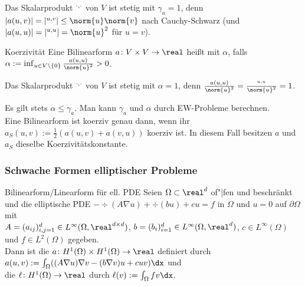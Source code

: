 \begin{Bsp}
    Das Skalarprodukt $\sp{\cdot, \cdot}$ von $V$ ist stetig mit $\gamma_a = 1$, denn
    $|a(u, v)| = |\sp{u, v}| \le \norm{u} \norm{v}$ nach Cauchy-Schwarz
    (und $|a(u, u)| = |\sp{u, u}| = \norm{u}^2$ für $u = v$).
\end{Bsp}

\linie

\begin{Def}{Koerzivität}
    Eine Bilinearform $a\colon V \times V \to \real$ heißt  mit
     $\alpha$, falls
    $\alpha := \inf_{u \in V \setminus \{0\}} \frac{a(u, u)}{\norm{u}^2} > 0$.
\end{Def}

\begin{Bsp}
    Das Skalarprodukt $\sp{\cdot, \cdot}$ von $V$ ist stetig mit $\alpha = 1$, denn
    $\frac{a(u, u)}{\norm{u}^2} = \frac{\sp{u, u}}{\norm{u}^2} = 1$.
\end{Bsp}

\linie

\begin{Bem}
    Es gilt stets $\alpha \le \gamma_a$.
    Man kann $\gamma_a$ und $\alpha$ durch EW-Probleme berechnen.\\
    Eine Bilinearform ist koerziv genau dann, wenn ihr 
    $a_S(u, v) := \frac{1}{2} (a(u, v) + a(v, u))$ koerziv ist.
    In diesem Fall besitzen $a$ und $a_S$ dieselbe Koerzivitätskonstante.
\end{Bem}

\pagebreak

\subsubsection{%
    Schwache Formen elliptischer Probleme%
}

\begin{Def}{Bilinearform/Linearform für ell. PDE}
    Seien $\Omega \subset \real^d$ of"|fen und beschränkt und die elliptische PDE
    $-\div(A\nabla u) + \div(bu) + cu = f$ in $\Omega$ und
    $u = 0$ auf $\partial\Omega$ mit\\
    $A = (a_{ij})_{i,j=1}^d \in L^\infty(\Omega, \real^{d \times d})$,
    $b = (b_i)_{i=1}^d \in L^\infty(\Omega, \real^d)$,
    $c \in L^\infty(\Omega)$ und
    $f \in L^2(\Omega)$ gegeben.\\
    Dann ist die
     $a\colon H^1(\Omega) \times H^1(\Omega) \to \real$
    definiert durch\\
    $a(u, v) := \int_\Omega ((A\nabla u) \nabla v - (b \nabla v) u + cuv) \dx$ und\\
    die  $\ell\colon H^1(\Omega) \to \real$ durch
    $\ell(v) := \int_\Omega fv \dx$.
\end{Def}

